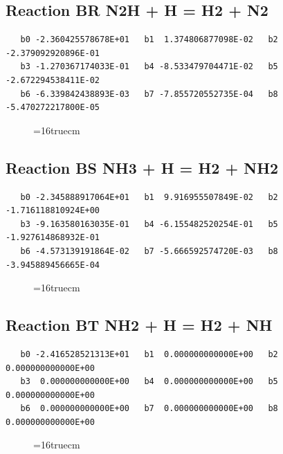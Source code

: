 \documentclass[12pt,dvipdfm]{article}
\begin{document}
\subsection{
Reaction BR N2H + H = H2 + N2 }
\begin{small}\begin{verbatim}
   b0 -2.360425578678E+01   b1  1.374806877098E-02   b2 -2.379092920896E-01
   b3 -1.270367174033E-01   b4 -8.533479704471E-02   b5 -2.672294538411E-02
   b6 -6.339842438893E-03   b7 -7.855720552735E-04   b8 -5.470272217800E-05
\end{verbatim}\end{small}
\begin{figure}[h!] \label{n2rates}
\epsfxsize=16truecm
\end{figure}
\newpage

\subsection{
Reaction BS NH3 + H = H2 + NH2 }
\begin{small}\begin{verbatim}
   b0 -2.345888917064E+01   b1  9.916955507849E-02   b2 -1.716118810924E+00
   b3 -9.163580163035E-01   b4 -6.155482520254E-01   b5 -1.927614868932E-01
   b6 -4.573139191864E-02   b7 -5.666592574720E-03   b8 -3.945889456665E-04
\end{verbatim}\end{small}
\begin{figure}[h!] \label{n2rates}
\epsfxsize=16truecm
\end{figure}
\newpage

\subsection{
Reaction BT NH2 + H = H2 + NH }
\begin{small}\begin{verbatim}
   b0 -2.416528521313E+01   b1  0.000000000000E+00   b2  0.000000000000E+00
   b3  0.000000000000E+00   b4  0.000000000000E+00   b5  0.000000000000E+00
   b6  0.000000000000E+00   b7  0.000000000000E+00   b8  0.000000000000E+00
\end{verbatim}\end{small}
\begin{figure}[h!] \label{n2rates}
\epsfxsize=16truecm
\end{figure}
\newpage
\end{document}
